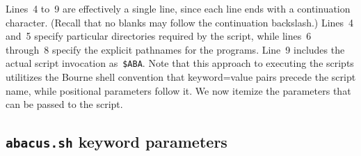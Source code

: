 Lines~4 to~9 are effectively a single line, since each line ends
with a continuation character.  (Recall that no blanks may follow
the continuation backslash.)  Lines~4 and~5 specify particular
directories required by the script, while lines~6 through~8
specify the explicit pathnames for the programs.  Line~9 includes
the actual script invocation as~\verb|$ABA|.  Note that this
approach to executing the scripts utilitizes the Bourne shell
convention that keyword=value pairs precede the script name, while
positional parameters follow it.  We now itemize the parameters
that can be passed to the script.

\subsection{{\tt abacus.sh} keyword parameters}
\label{sec:keyscr}

